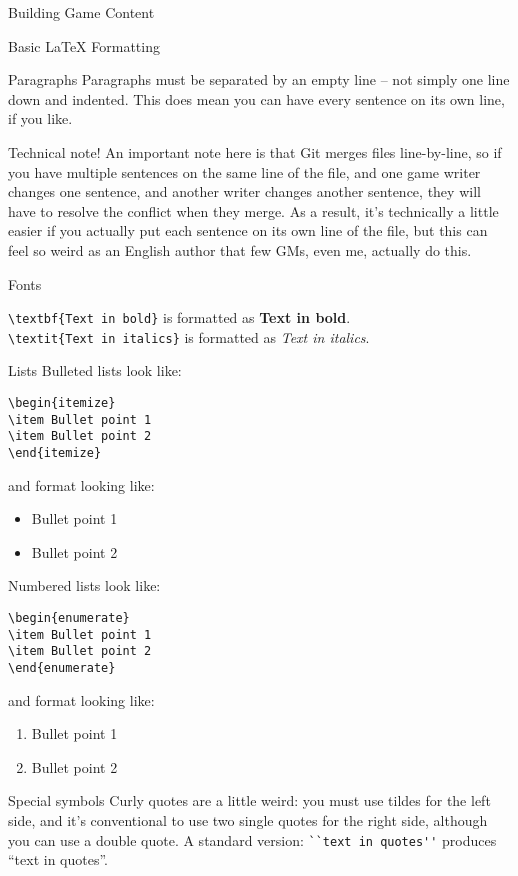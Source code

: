 \documentclass[11pt,  total={6in, 8in}]{article}
\begin{document}
\begin{section}{Building Game Content}
\begin{subsection}{Basic \LaTeX{} Formatting}
\begin{subsubsection}{Paragraphs}
Paragraphs must be separated by an empty line – not simply one line down and indented.  This does mean you can have every sentence on its own line, if you like.  

Technical note! An important note here is that Git merges files line-by-line, so if you have multiple sentences on the same line of the file, and one game writer changes one sentence, and another writer changes another sentence, they will have to resolve the conflict when they merge.  As a result, it's technically a little easier if you actually put each sentence on its own line of the file, but this can feel so weird as an English author that few GMs, even me, actually do this.
\end{subsubsection}
\begin{subsubsection}{Fonts}

\lstinline|\textbf{Text in bold}| is formatted as \textbf{Text in bold}.\\
\lstinline|\textit{Text in italics}| is formatted as \textit{Text in italics}.
\end{subsubsection}
\begin{subsubsection}{Lists}
Bulleted lists look like:
\begin{verbatim}
\begin{itemize}
\item Bullet point 1
\item Bullet point 2
\end{itemize}
\end{verbatim}
and format looking like:
\begin{itemize}
\item Bullet point 1
\item Bullet point 2
\end{itemize}
Numbered lists look like:
\begin{verbatim}
\begin{enumerate}
\item Bullet point 1
\item Bullet point 2
\end{enumerate}
\end{verbatim}
and format looking like:
\begin{enumerate}
\item Bullet point 1
\item Bullet point 2
\end{enumerate}
\end{subsubsection}
\begin{subsubsection}{Special symbols}
Curly quotes are a little weird: you must use tildes for the left side, and it's conventional to use two single quotes for the right side, although you can use a double quote.  A standard version: \lstinline{``text in quotes''} produces ``text in quotes''.


\end{subsubsection}
\end{subsection}
\end{section}
\end{document}
